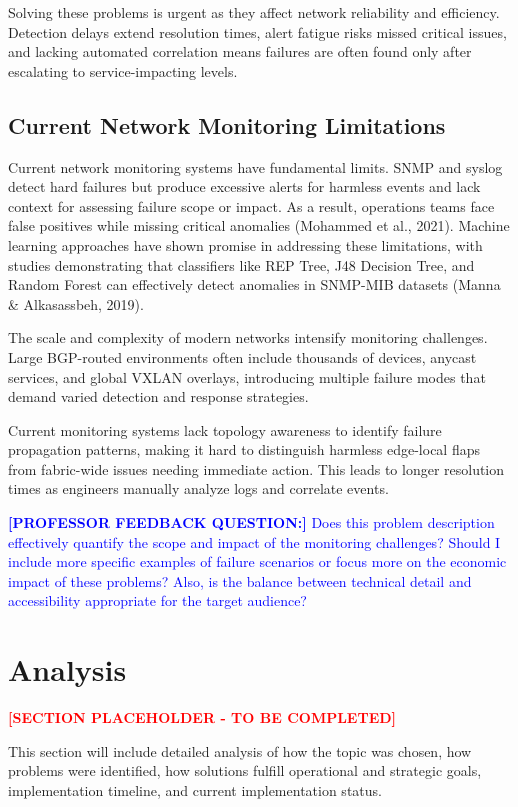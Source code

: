 \documentclass[11pt]{article}
\begin{document}
Solving these problems is urgent as they affect network reliability and efficiency. Detection delays extend resolution times, alert fatigue risks missed critical issues, and lacking automated correlation means failures are often found only after escalating to service-impacting levels.

\subsection{Current Network Monitoring Limitations}

Current network monitoring systems have fundamental limits. SNMP and syslog detect hard failures but produce excessive alerts for harmless events and lack context for assessing failure scope or impact. As a result, operations teams face false positives while missing critical anomalies (Mohammed et al., 2021). Machine learning approaches have shown promise in addressing these limitations, with studies demonstrating that classifiers like REP Tree, J48 Decision Tree, and Random Forest can effectively detect anomalies in SNMP-MIB datasets (Manna \& Alkasassbeh, 2019).

The scale and complexity of modern networks intensify monitoring challenges. Large BGP-routed environments often include thousands of devices, anycast services, and global VXLAN overlays, introducing multiple failure modes that demand varied detection and response strategies.

Current monitoring systems lack topology awareness to identify failure propagation patterns, making it hard to distinguish harmless edge-local flaps from fabric-wide issues needing immediate action. This leads to longer resolution times as engineers manually analyze logs and correlate events.

\textcolor{blue}{\textbf{[PROFESSOR FEEDBACK QUESTION:]} Does this problem description effectively quantify the scope and impact of the monitoring challenges? Should I include more specific examples of failure scenarios or focus more on the economic impact of these problems? Also, is the balance between technical detail and accessibility appropriate for the target audience?}

\section{Analysis}

\textcolor{red}{\textbf{[SECTION PLACEHOLDER - TO BE COMPLETED]}}

This section will include detailed analysis of how the topic was chosen, how problems were identified, how solutions fulfill operational and strategic goals, implementation timeline, and current implementation status.
\end{document}
